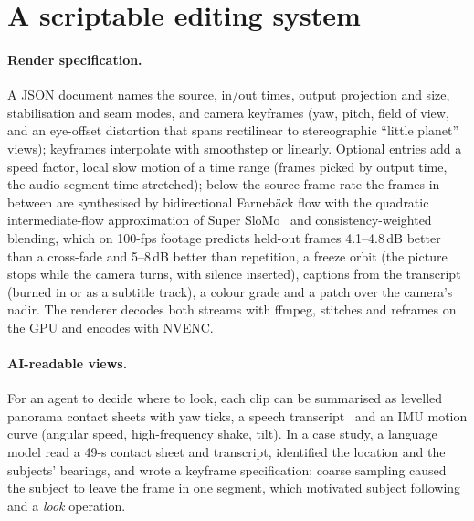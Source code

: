 \documentclass[11pt]{article}
\begin{document}
\section{A scriptable editing system}\label{sec:system}

\paragraph{Render specification.} A JSON document names the source, in/out times, output projection and size, stabilisation and seam modes, and camera keyframes (yaw, pitch, field of view, and an eye-offset distortion that spans rectilinear to stereographic ``little planet'' views); keyframes interpolate with smoothstep or linearly. Optional entries add a speed factor, local slow motion of a time range (frames picked by output time, the audio segment time-stretched); below the source frame rate the frames in between are synthesised by bidirectional Farneb\"ack flow with the quadratic intermediate-flow approximation of Super SloMo~\cite{jiang2018superslomo} and consistency-weighted blending, which on 100-fps footage predicts held-out frames 4.1--4.8\,dB better than a cross-fade and 5--8\,dB better than repetition, a freeze orbit (the picture stops while the camera turns, with silence inserted), captions from the transcript (burned in or as a subtitle track), a colour grade and a patch over the camera's nadir. The renderer decodes both streams with ffmpeg, stitches and reframes on the GPU and encodes with NVENC.

\paragraph{AI-readable views.} For an agent to decide where to look, each clip can be summarised as levelled panorama contact sheets with yaw ticks, a speech transcript~\cite{radford2023whisper} and an IMU motion curve (angular speed, high-frequency shake, tilt). In a case study, a language model read a 49-s contact sheet and transcript, identified the location and the subjects' bearings, and wrote a keyframe specification; coarse sampling caused the subject to leave the frame in one segment, which motivated subject following and a \emph{look} operation.
\end{document}
